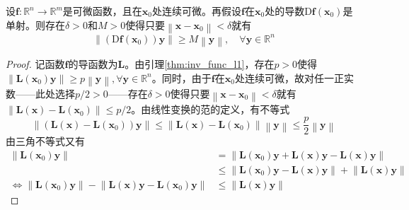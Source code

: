 \documentclass[../main.tex]{subfiles}
\begin{document}
\begin{lemma}\label{thm:inv_func_l2}
    设$\mathbf{f}:\mathbb{R}^n\rightarrow\mathbb{R}^m$是可微函数，且在$\mathbf{x}_0$处连续可微。再假设$\mathbf{f}$在$\mathbf{x}_0$处的导数$\mathrm{D}\mathbf{f}\left(\mathbf{x}_0\right)$是单射。则存在$\delta>0$和$M>0$使得只要$\left\|\mathbf{x}-\mathbf{x}_0\right\|<\delta$就有
    \[
        \left\|\left(\mathrm{D}\mathbf{f}\left(\mathbf{x}_0\right)\right)\mathbf{y}\right\|\geq M\left\|\mathbf{y}\right\|,\quad\forall\mathbf{y}\in\mathbb{R}^n
    \]
\end{lemma}
\begin{proof}
    记函数$\mathbf{f}$的导函数为$\mathbf{L}$。由引理\ref{thm:inv_func_l1}，存在$p>0$使得$\left\|\mathbf{L}\left(\mathbf{x}_0\right)\mathbf{y}\right\|\geq p\left\|\mathbf{y}\right\|,\forall\mathbf{y}\in\mathbb{R}^n$。同时，由于$\mathbf{f}$在$\mathbf{x}_0$处连续可微，故对任一正实数——此处选择$p/2>0$——存在$\delta>0$使得只要$\left\|\mathbf{x}-\mathbf{x}_0\right\|<\delta$就有$\left\|\mathbf{L}\left(\mathbf{x}\right)-\mathbf{L}\left(\mathbf{x}_0\right)\right\|\leq p/2$。由线性变换的范的定义，有不等式
    \[
        \left\|\left(\mathbf{L}\left(\mathbf{x}\right)-\mathbf{L}\left(\mathbf{x}_0\right)\right)\mathbf{y}\right\|\leq\left\|\mathbf{L}\left(\mathbf{x}\right)-\mathbf{L}\left(\mathbf{x}_0\right)\right\|\left\|\mathbf{y}\right\|\leq\frac{p}{2}\left\|\mathbf{y}\right\|\]
    由三角不等式又有
    \begin{align*}
        \left\|\mathbf{L}\left(\mathbf{x}_0\right)\mathbf{y}\right\|                                                                                                                         & =\left\|\mathbf{L}\left(\mathbf{x}_0\right)\mathbf{y}+\mathbf{L}\left(\mathbf{x}\right)\mathbf{y}-\mathbf{L}\left(\mathbf{x}\right)\mathbf{y}\right\|                   \\
                                                                                                                                                                                             & \leq\left\|\mathbf{L}\left(\mathbf{x}_0\right)\mathbf{y}-\mathbf{L}\left(\mathbf{x}\right)\mathbf{y}\right\|+\left\|\mathbf{L}\left(\mathbf{x}\right)\mathbf{y}\right\| \\
        \Leftrightarrow\left\|\mathbf{L}\left(\mathbf{x}_0\right)\mathbf{y}\right\|-\left\|\mathbf{L}\left(\mathbf{x}\right)\mathbf{y}-\mathbf{L}\left(\mathbf{x}_0\right)\mathbf{y}\right\| & \leq\left\|\mathbf{L}\left(\mathbf{x}\right)\mathbf{y}\right\|
    \end{align*}

\end{proof}
\end{document}
